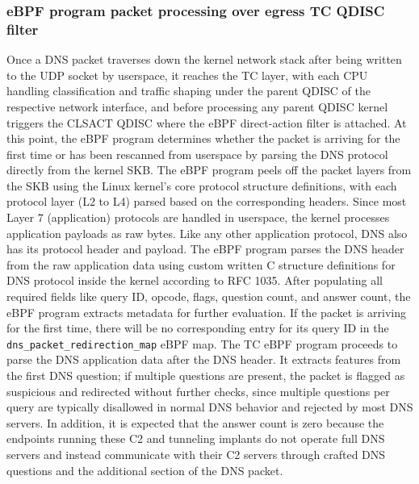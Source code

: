 \documentclass [11pt, proquest] {uwthesis}[2020/02/24]
\begin{document}
\subsubsection{\textbf{eBPF program packet processing over egress TC QDISC filter}}
\label{active:sec1}
Once a DNS packet traverses down the kernel network stack after being written to the UDP socket by userspace, it reaches the TC layer, with each CPU handling classification and traffic shaping under the parent QDISC of the respective network interface, and before processing any parent QDISC kernel triggers the CLSACT QDISC where the eBPF direct-action filter is attached. At this point, the eBPF program determines whether the packet is arriving for the first time or has been rescanned from userspace by parsing the DNS protocol directly from the kernel SKB. The eBPF program peels off the packet layers from the SKB using the Linux kernel’s core protocol structure definitions, with each protocol layer (L2 to L4) parsed based on the corresponding headers. Since most Layer 7 (application) protocols are handled in userspace, the kernel processes application payloads as raw bytes. Like any other application protocol, DNS also has its protocol header and payload. The eBPF program parses the DNS header from the raw application data using custom written C structure definitions for DNS protocol inside the kernel according to RFC 1035. After populating all required fields like query ID, opcode, flags, question count, and answer count, the eBPF program extracts metadata for further evaluation. If the packet is arriving for the first time, there will be no corresponding entry for its query ID in the \texttt{dns\_packet\_redirection\_map} eBPF map. The TC eBPF program proceeds to parse the DNS application data after the DNS header. It extracts features from the first DNS question; if multiple questions are present, the packet is flagged as suspicious and redirected without further checks, since multiple questions per query are typically disallowed in normal DNS behavior and rejected by most DNS servers. In addition, it is expected that the answer count is zero because the endpoints running these C2 and tunneling implants do not operate full DNS servers and instead communicate with their C2 servers through crafted DNS questions and the additional section of the DNS packet.
\end{document}
